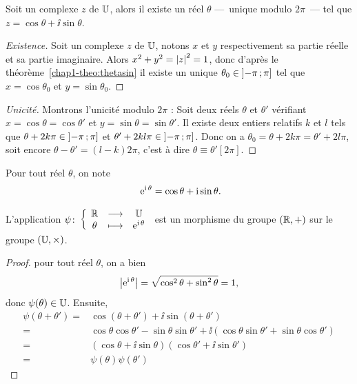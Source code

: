 %
\begin{prop}\label{prop:expsurj}
  Soit un complexe $z$ de $\mathbb{U}$, alors il existe un réel $\theta$ ---~unique modulo $2\pi$~--- tel que $z=\cos\theta +\ii\sin\theta$.
\end{prop}
\begin{proof}[Existence]
  Soit un complexe $z$ de $\mathbb{U}$, notons $x$ et $y$ respectivement sa partie réelle et sa partie imaginaire. Alors $x^2+y^2=\left\lvert z\right\rvert^2=1$, donc d'après le théorème~\ref{chap1-theo:thetasin} il existe un unique $\theta_0 \in \left] -\pi \, ;  \pi \right]$ tel que $x=\cos\theta_0$ et $y=\sin\theta_0$.
\end{proof}
\begin{proof}[Unicité]
  Montrons l'unicité modulo $2\pi$ : Soit deux réels $\theta$ et $\theta'$ vérifiant  $x=\cos \theta=\cos \theta'$ et $y=\sin \theta = \sin \theta'$. Il existe deux entiers relatifs $k$ et $l$ tels que $\theta +2k \pi \in \left] -\pi \, ;  \pi \right]$ et $\theta' +2kl \pi \in \left] -\pi \, ;  \pi \right]$. Donc on a $\theta_0=\theta + 2k \pi=\theta'+2l \pi$, soit encore $\theta-\theta'=(l-k) 2\pi$, c'est à dire $\theta \equiv \theta' [2\pi]$.
\end{proof}
%
\begin{defdef}
  Pour tout réel $\theta$, on note
  \begin{equation}\
    \operatorname{e}^{\operatorname{i} \theta}=\cos\theta +\operatorname{i}\sin\theta.
  \end{equation}
\end{defdef}
%
\begin{prop}
  L'application $\psi\colon \left\{\begin{array}{ccc} \mathbb{R} & \longrightarrow &\mathbb{U}\\ \theta & \longmapsto & \operatorname{e}^{\operatorname{i} \theta} \end{array} \right.$ est un morphisme du groupe $(\mathbb{R},+)$ sur le groupe $(\mathbb{U},\times)$.
\end{prop}
\begin{proof}
  pour tout réel $\theta$, on a bien
  \begin{equation}
    \left\lvert\operatorname{e}^{\operatorname{i} \theta}\right\rvert=\sqrt{\cos^2 \theta + \sin^2 \theta}=1,
  \end{equation}
  donc $\psi(\theta) \in \mathbb{U}$. Ensuite,
  \begin{align}
    \psi(\theta +\theta') = &\cos(\theta +\theta') + \ii \sin(\theta + \theta')\\
    =&\cos \theta \cos \theta' - \sin \theta \sin \theta' +\ii(\cos \theta \sin \theta' + \sin \theta \cos \theta')\\
    =&(\cos \theta + \ii \sin \theta)(\cos \theta' + \ii \sin \theta')\\
    =&\psi(\theta) \psi(\theta')
  \end{align}
\end{proof}
